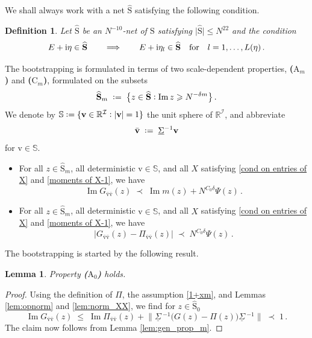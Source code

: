 \documentclass[11pt]{article} %
\numberwithin{equation}{section}
\numberwithin{figure}{section}
\theoremstyle{plain} %
\newtheorem{lemma}[theorem]{Lemma}
\newtheorem{definition}[theorem]{Definition}
\theoremstyle{definition} %
\newcommand{\f}[1]{\boldsymbol{\mathrm{#1}}} %
\newcommand{\bb}{\mathbb} %
\renewcommand{\cal}{\mathcal}
\newcommand{\ul}[1]{\underline{#1} \!\,} %
\newcommand{\wh}{\widehat}
\newcommand{\txt}[1]{\text{\rm{#1}}}
\newcommand{\R}{\mathbb{R}}
\newcommand{\ii}{\mathrm{i}}
\newcommand{\col}{\mathrel{\vcenter{\baselineskip0.75ex \lineskiplimit0pt \hbox{.}\hbox{.}}}}
\newcommand*{\deq}{\mathrel{\vcenter{\baselineskip0.65ex \lineskiplimit0pt \hbox{.}\hbox{.}}}=}
\renewcommand{\leq}{\leqslant}
\renewcommand{\geq}{\geqslant}
\newcommand{\pb}[1]{\bigl({#1}\bigr)}
\newcommand{\h}[1]{\{{#1}\}}
\newcommand{\hb}[1]{\bigl\{{#1}\bigr\}}
\newcommand{\abs}[1]{\lvert #1 \rvert}
\newcommand{\absb}[1]{\bigl\lvert #1 \bigr\rvert}
\newcommand{\normb}[1]{\bigl\lVert #1 \bigr\rVert}
\DeclareMathOperator{\im}{Im}
\begin{document}
We shall always work with a net $\wh{\f S}$ satisfying the following condition.
\begin{definition}
Let $\wh{\f S}$ be an $N^{-10}$-net of $\f S$ satisfying $\abs{\wh{\f S}} \leq N^{22}$ and the condition
\begin{equation*}
E + \ii \eta \in \wh{\f S} \qquad \Longrightarrow \qquad E + \ii \eta_l \in \wh{\f S} \quad \txt{for} \quad l = 1, \dots, L(\eta)\,.
\end{equation*}
\end{definition}

The bootstrapping is formulated in terms of two scale-dependent properties, \textbf{($\f A_m$)} and \textbf{($\f C_m$)}, formulated on the subsets
\begin{equation*}
\wh{\f S}_m \;\deq\; \hb{z \in \wh{\f S} \col \im z \geq N^{-\delta m}}\,.
\end{equation*}
We denote by $\bb S \deq \h{\f v \in \R^{\cal I} \col \abs{\f v} = 1}$ the unit sphere of $\R^{\cal I}$, and abbreviate
\begin{equation} \label{def_bar_v}
\bar {\f v} \;\deq\; \ul \Sigma^{-1} \f v
\end{equation}
for $\f v \in \bb S$.


\begin{itemize}
\item[\textbf{($\f A_m$)}]
For all $z \in \wh{\f S}_m$, all deterministic $\f v \in \bb S$, and all $X$ satisfying \eqref{cond on entries of X} and \eqref{moments of X-1}, we have
\begin{equation} \label{bound_assumption}
\im G_{\bar {\f v} \bar {\f v}}(z) \;\prec\; \im m(z) + N^{C_0 \delta} \Psi(z)\,.
\end{equation}
\item[\textbf{($\f C_m$)}]
For all $z \in \wh{\f S}_m$, all deterministic $\f v \in \bb S$, and all $X$ satisfying \eqref{cond on entries of X} and \eqref{moments of X-1}, we have
\begin{equation} \label{bound_goal}
\absb{G_{\bar {\f v} \bar {\f v}}(z) - \Pi_{\bar {\f v} \bar {\f v}}(z)} \;\prec\; N^{C_0 \delta} \Psi(z)\,.
\end{equation}
\end{itemize}

The bootstrapping is started by the following result.
\begin{lemma} \label{lem:start_induction}
Property \textbf{($\f A_0$)} holds.
\end{lemma}
\begin{proof}
Using the definition of $\Pi$, the assumption \eqref{1+xm}, and Lemmas \ref{lem:opnorm} and \ref{lem:norm_XX}, we find for $z \in \wh {\f S}_0$
\begin{equation*}
\im G_{\bar {\f v} \bar {\f v}}(z) \;\leq\; \im \Pi_{\bar {\f v} \bar {\f v}}(z) + \normb{\ul \Sigma^{-1} \pb{G(z) - \Pi(z)} \ul \Sigma^{-1}} \;\prec\; 1\,.
\end{equation*}
The claim now follows from Lemma \ref{lem:gen_prop_m}.
\end{proof}
\end{document}
